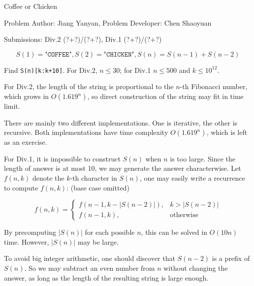 \begin{Solution}{Coffee or Chicken}

\begin{frame}{\ProblemName}

\small Problem Author: Jiang Yanyan, Problem Developer: Chen Shaoyuan \par \vspace{0.3cm}

\small Submissions: Div.2 (?+?)/(?+?), Div.1 (?+?)/(?+?) \par \vspace{0.5cm}

$$S(1) = \texttt{"COFFEE"}, S(2) = \texttt{"CHICKEN"}, S(n) = S(n-1) + S(n-2)$$

Find \texttt{S(n)[k:k+10]}. For Div.2, $n \leq 30$; for Div.1 $n \leq 500$ and $k \leq 10^{12}$.

\pause

For Div.2, the length of the string is proportional to the $n$-th Fibonacci number, which grows in $O(1.619^n)$, so direct construction of the string may fit in time limit. 

There are mainly two different implementations. One is iterative, the other is recursive. Both implementations have time complexity $O(1.619^n)$, which is left as an exercise.

\end{frame}

\begin{frame}{\ProblemName}

For Div.1, it is impossible to construct $S(n)$ when $n$ is too large. Since the length of answer is at most 10, we may generate the answer characterwise. Let $f(n, k)$ denote the $k$-th character in $S(n)$, one may easily write a recurrence to compute $f(n, k)$: (base case omitted)

$$ f(n, k) = \begin{cases}
f(n-1, k - |S(n-2)|), & k > |S(n-2)| \\
f(n-1, k), & \text{otherwise}
\end{cases} $$

\pause

By precomputing $|S(n)|$ for each possible $n$, this can be solved in $O(10n)$ time. However, $|S(n)|$ may be large.

\pause

To avoid big integer arithmetic, one should discover that $S(n-2)$ is a prefix of $S(n)$. So we may subtract an even number from $n$ without changing the answer, as long as the length of the resulting string is large enough.

\end{frame}

\end{Solution}
